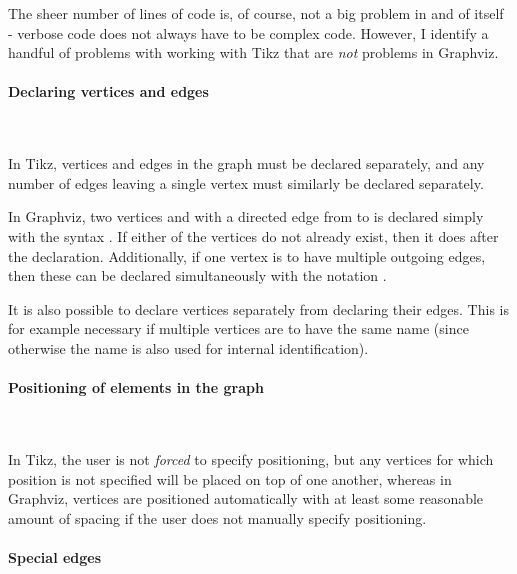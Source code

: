 \medskip

The sheer number of lines of code is, of course, not a big problem in and of
itself - verbose code does not always have to be complex code. However, I
identify a handful of problems with working with Tikz that are \emph{not}
problems in Graphviz.



\paragraph{Declaring vertices and edges}~\smallskip

In Tikz, vertices and edges in the graph must be declared separately, and any
number of edges leaving a single vertex must similarly be declared separately.

\medskip

In Graphviz, two vertices  and  with a directed edge from  to
 is declared simply with the syntax . If either of the vertices
do not already exist, then it does after the declaration. Additionally, if one
vertex is to have multiple outgoing edges, then these can be declared
simultaneously with the notation .

\smallskip

It is also possible to declare vertices separately from declaring their edges.
This is for example necessary if multiple vertices are to have the same name
(since otherwise the name is also used for internal identification).

\paragraph{Positioning of elements in the graph}~\smallskip

In Tikz, the user is not \emph{forced} to specify positioning, but any vertices
for which position is not specified will be placed on top of one another,
whereas in Graphviz, vertices are positioned automatically with at least some
reasonable amount of spacing if the user does not manually specify positioning.

\paragraph{Special edges}~\smallskip

